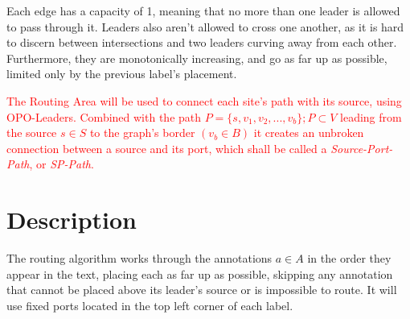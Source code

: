 \documentclass[11pt,a4paper]{vutinfth}
\newcommand{\change}[1]{\textcolor{red}{#1}}
\begin{document}
Each edge has a capacity of 1, meaning that no more than one leader is allowed to pass through it. Leaders also aren't allowed to cross one another, as it is hard to discern between intersections and two leaders curving away from each other. Furthermore, they are monotonically increasing, and go as far up as possible, limited only by the previous label's placement.

\change{The Routing Area will be used to connect each site's path with its source, using OPO-Leaders. Combined with the path $P=\{s, v_1, v_2, ..., v_b\}; P \subset V$ leading from the source $s \in S$ to the graph's border $(v_b \in B)$ it creates an unbroken connection between a source and its port, which shall be called a \emph{Source-Port-Path}, or \emph{SP-Path}.}

\section{Description}

The routing algorithm works through the annotations $a \in A$ in the order they appear in the text, placing each as far up as possible, skipping any annotation that cannot be placed above its leader's source or is impossible to route. It will use fixed ports located in the top left corner of each label.
\end{document}
